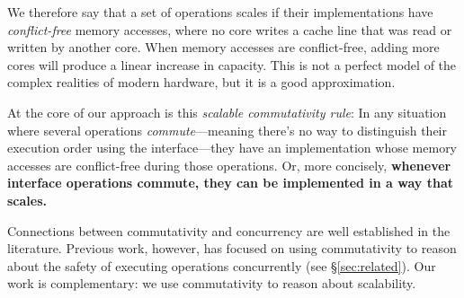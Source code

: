 We therefore say that a set of operations scales if their implementations
have \emph{conflict-free} memory accesses, where no core writes a
cache line that was read or written by another core.
%
When memory accesses are conflict-free, adding more cores will produce
a linear increase in capacity.
This is not a perfect model of the complex realities of
modern hardware, but it is a good approximation. 

At the core of our approach is this \emph{scalable commutativity rule}: In any
situation where several operations \emph{commute}---meaning
there's no way to distinguish their execution order using the
interface---they have an implementation whose memory accesses
are conflict-free during those operations.
Or, more concisely,
\textbf{whenever interface operations commute, they can be implemented in a way
  that scales.}
%
%

Connections between commutativity and concurrency are well
established in the literature.  Previous work, however, has focused on
using commutativity to reason about the safety of executing operations
concurrently (see \S\ref{sec:related}).  Our work is complementary: we
use commutativity to reason about scalability.


